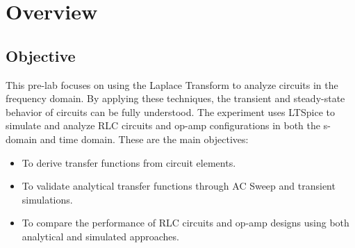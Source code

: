 \chapter{Overview}

\section{Objective}
This pre-lab focuses on using the Laplace Transform to analyze circuits in the frequency domain. By applying these techniques, the transient and steady-state behavior of circuits can be fully understood. The experiment uses LTSpice to simulate and analyze RLC circuits and op-amp configurations in both the s-domain and time domain. These are the main objectives:

\begin{itemize}
    \item To derive transfer functions from circuit elements.
    \item To validate analytical transfer functions through AC Sweep and transient simulations.
    \item To compare the performance of RLC circuits and op-amp designs using both analytical and simulated approaches.
\end{itemize}
